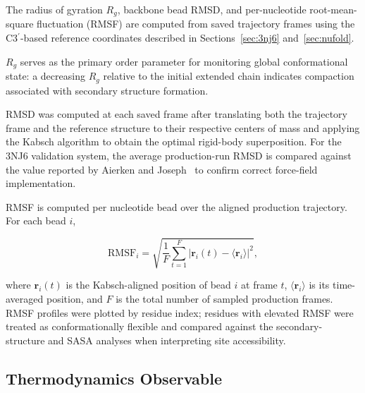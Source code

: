 The radius of gyration $R_g$, backbone bead RMSD, and per-nucleotide
root-mean-square fluctuation (RMSF) are computed from saved trajectory
frames using the C3$^\prime$-based reference coordinates described in
Sections~\ref{sec:3nj6} and~\ref{sec:nufold}.

$R_g$ serves as the primary order parameter for monitoring global
conformational state: a decreasing $R_g$ relative to the initial
extended chain indicates compaction associated with secondary structure
formation.

RMSD was computed at each saved frame after translating both the
trajectory frame and the reference structure to their respective centers
of mass and applying the Kabsch algorithm to obtain the optimal
rigid-body superposition.
For the 3NJ6 validation system, the average production-run RMSD is
compared against the value reported by Aierken and
Joseph~\cite{Aierken2024} to confirm correct force-field implementation.

RMSF is computed per nucleotide bead over the aligned production
trajectory.
For each bead $i$,

\begin{equation}
  \mathrm{RMSF}_i = \sqrt{\frac{1}{F}\sum_{t=1}^{F}
    \left|\mathbf{r}_i(t) - \langle\mathbf{r}_i\rangle\right|^2},
  \label{eq:rmsf}
\end{equation}

where $\mathbf{r}_i(t)$ is the Kabsch-aligned position of bead $i$ at
frame $t$, $\langle\mathbf{r}_i\rangle$ is its time-averaged position,
and $F$ is the total number of sampled production frames.
RMSF profiles were plotted by residue index; residues with elevated RMSF
were treated as conformationally flexible and compared against the
secondary-structure and SASA analyses when interpreting site
accessibility.



\subsection{Thermodynamics Observable }


